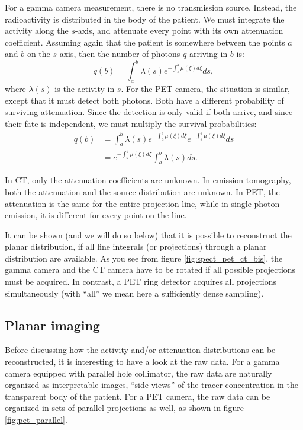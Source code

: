 \documentclass[11pt,oneside]{article}
\begin{document}
For a gamma camera measurement, there is no transmission source. Instead, the
radioactivity is distributed in the body of the patient. We must integrate the
activity along the $s$-axis, and attenuate every point with its own
attenuation coefficient. Assuming again that the patient is somewhere between
the points $a$ and $b$ on the $s$-axis, then the number of photons $q$ arriving
in $b$ is:
\begin{equation}
  q(b) = \int_a^b \lambda(s) e^{- \int_s^b \mu(\xi) d\xi} ds,
   \label{eq:spect_proj}
\end{equation}
where $\lambda(s)$ is the activity in $s$.
For the PET camera, the situation is similar, except that it must detect both
photons. Both have a different probability of surviving attenuation. Since the
detection is only valid if both arrive, and since their fate is independent,
we must multiply the survival probabilities:
\begin{align}
  q(b) &= \int_a^b \lambda(s) e^{- \int_a^s \mu(\xi) d\xi} 
                             e^{- \int_s^b \mu(\xi) d\xi} ds \\
  &= e^{- \int_a^b \mu(\xi) d\xi} \int_a^b \lambda(s) ds.
        \label{eq:pet_proj}
\end{align}

In CT, only the attenuation coefficients are unknown. In emission tomography,
both the attenuation and the source distribution are unknown. In PET, the
attenuation is the same for the entire projection line, while in single photon
emission, it is different for every point on the line.

It can be shown (and we will do so below) that it is possible to reconstruct
the planar distribution, if all line integrals (or projections) through a
planar distribution are available. As you see from figure
\ref{fig:spect_pet_ct_bis}, the gamma camera and the CT camera have to be
rotated if all possible projections must be acquired. In contrast, a PET ring
detector acquires all projections simultaneously (with ``all'' we mean here a
sufficiently dense sampling).

\subsection{Planar imaging}
Before discussing how the activity and/or attenuation distributions can be
reconstructed, it is interesting to have a look at the raw data. For a gamma
camera equipped with parallel hole collimator, the raw data are naturally
organized as interpretable images, ``side views'' of the tracer concentration
in the transparent body of the patient. For a PET camera, the raw data can be
organized in sets of parallel projections as well, as shown in figure
\ref{fig:pet_parallel}. 
\end{document}
